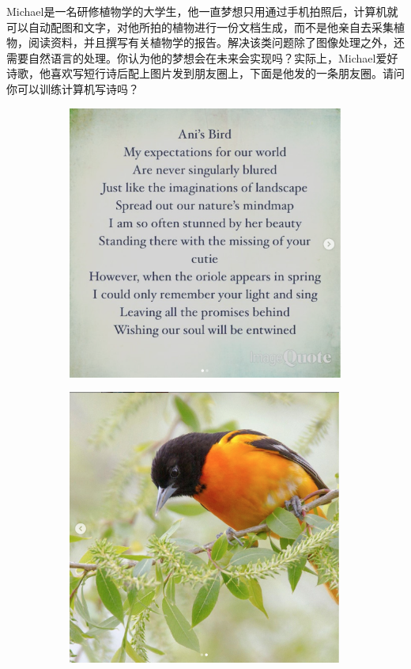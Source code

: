 \documentclass[12pt]{article}
\newenvironment{fullmodel}{
			\smallskip\noindent
			\begin{minipage}{\textwidth+\marginparwidth+\marginparsep}\smallskip\smallskip}
			{\smallskip\smallskip\end{minipage}\vspace{.1in}
			}
\numberwithin{equation}{section}
\numberwithin{figure}{section}
\newenvironment{question}[2][Question]{\begin{trivlist}
\item[\hskip \labelsep {\bfseries #1}\hskip \labelsep {\bfseries #2.}]}{\end{trivlist}}
\begin{document}
\begin{fullmodel}
\begin{question}{思考题C3-Q1}
	Michael是一名研修植物学的大学生，他一直梦想只用通过手机拍照后，计算机就可以自动配图和文字，对他所拍的植物进行一份文档生成，而不是他亲自去采集植物，阅读资料，并且撰写有关植物学的报告。解决该类问题除了图像处理之外，还需要自然语言的处理。你认为他的梦想会在未来会实现吗？实际上，Michael爱好诗歌，他喜欢写短行诗后配上图片发到朋友圈上，下面是他发的一条朋友圈。请问你可以训练计算机写诗吗？
	\begin{figure}[H]
		\centering
		\begin{subfigure}[b]{0.45\textwidth}
			\centering
			\includegraphics[width=\textwidth]{fig/poetry1}
		\end{subfigure}
		\begin{subfigure}[b]{0.45\textwidth}
			\includegraphics[width=0.99\textwidth]{fig/peotry2}

\end{subfigure}
\end{figure}
\end{question}
\end{fullmodel}
\end{document}
